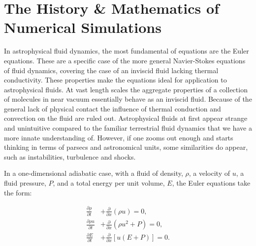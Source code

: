 \section{The History \& Mathematics of Numerical Simulations}
\label{sec:numerical-math}
\label{sec:numsim}

In astrophysical fluid dynamics, the most fundamental of equations are the Euler equations.
These are a specific case of the more general Navier-Stokes equations of fluid dynamics, covering the case of an inviscid fluid lacking thermal conductivity.
These properties make the equations ideal for application to astrophysical fluids.
At vast length scales the aggregate properties of a collection of molecules in near vacuum essentially behave as an inviscid fluid.
Because of the general lack of physical contact the influence of thermal conduction and convection on the fluid are ruled out.
Astrophysical fluids at first appear strange and unintuitive compared to the familiar terrestrial fluid dynamics that we have a more innate understanding of.
However, if one zooms out enough and starts thinking in terms of parsecs and astronomical units, some similarities do appear, such as instabilities, turbulence and shocks.

In a one-dimensional adiabatic case, with a fluid of density, $\rho$, a velocity of $u$, a fluid pressure, $P$, and a total energy per unit volume, $E$, the Euler equations take the form:

\begin{subequations}
  \begin{align}
    \frac{\partial \rho}{\partial t} & + \frac{\partial}{\partial x} (\rho u) = 0 ,\\
    \frac{\partial \rho u}{\partial t} & + \frac{\partial}{\partial x} (\rho u^2 + P) = 0 ,\\
    \frac{\partial E}{\partial t} & + \frac{\partial}{\partial x} \left[ u(E+P) \right] = 0 .
  \end{align}
\end{subequations}

